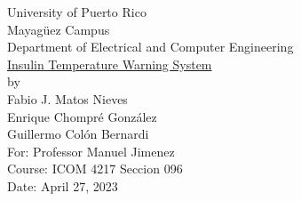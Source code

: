 \begin{titlepage}
  \begin{center}
    \large{University of Puerto Rico\\
    Mayagüez Campus\\
    \vspace{\baselineskip}
    Department of Electrical and Computer Engineering\\}
    \vspace{6cm}
    \Huge{\underline{Insulin Temperature Warning System}\\}
    \vspace{0.5\baselineskip}
    \large by\\
    Fabio J. Matos Nieves\\
    Enrique Chompré González\\
    Guillermo Colón Bernardi\\
    \vspace{4.5cm}
    For: Professor Manuel Jimenez\\
    Course: ICOM 4217 Seccion 096\\
    Date: April 27, 2023\\
    \normalsize

  \end{center}
\end{titlepage}
